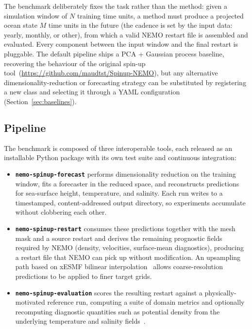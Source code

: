 \documentclass{article}
\begin{document}
The benchmark deliberately fixes the task rather than the method: given a
simulation window of $N$ training time units, a method must produce a
projected ocean state $M$ time units in the future (the cadence is set
by the input data: yearly, monthly, or other), from which a valid NEMO
restart file
is assembled and evaluated. Every component between the input window and
the final restart is pluggable. The default pipeline ships a PCA +
Gaussian process baseline, recovering the behaviour of the original
spin-up tool~(\url{https://github.com/maudtst/Spinup-NEMO}), but any alternative
dimensionality-reduction or forecasting strategy can be substituted by
registering a new class and selecting it through a YAML configuration
(Section~\ref{sec:baselines}).

\subsection{Pipeline}
\label{sec:pipeline}

The benchmark is composed of three interoperable tools, each released as
an installable Python package with its own test suite and continuous
integration:

\begin{itemize}
  \item \textbf{\texttt{nemo-spinup-forecast}} performs
    dimensionality reduction on the training window, fits a forecaster in
    the reduced space, and reconstructs predictions for sea-surface
    height, temperature, and salinity. Each run writes to a timestamped,
    content-addressed output directory, so experiments accumulate without
    clobbering each other.
  \item \textbf{\texttt{nemo-spinup-restart}} consumes these predictions
    together with the mesh mask and a source restart and derives the
    remaining prognostic fields required by NEMO (density, velocities,
    surface-mean diagnostics), producing a restart file that NEMO can
    pick up without modification. An upsampling path based on
    xESMF bilinear interpolation~\citep{meunier_learning_2025} allows
    coarse-resolution predictions to be applied to finer target grids.
  \item \textbf{\texttt{nemo-spinup-evaluation}} scores the resulting
    restart against a physically-motivated reference run, computing a
    suite of domain metrics and optionally recomputing diagnostic
    quantities such as potential density from the underlying temperature
    and salinity fields~\citep{archer_spinup-evaluation_2026}.
\end{itemize}
\end{document}

